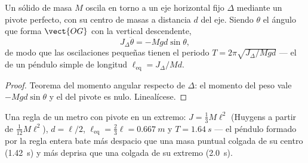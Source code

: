 \begin{proposition}\label{prop:b2:rigid-body-mechanics:pendulum}
Un sólido de masa $M$ oscila en torno a un eje horizontal fijo $\Delta$
mediante un pivote perfecto, con su centro de masas a distancia $d$ del
eje. Siendo $\theta$ el ángulo que forma $\vect{OG}$ con la vertical descendente,
\[
J_\Delta\ddot\theta = -Mgd\sin\theta ,
\]
de modo que las oscilaciones pequeñas tienen el periodo $T = 2\pi\sqrt{J_\Delta/Mgd}$
--- el de un péndulo simple de longitud $\ell_{\text{eq}} = J_\Delta/Md$.
\end{proposition}

\begin{proof}
Teorema del momento angular respecto de $\Delta$: el momento del peso vale
$-Mgd\sin\theta$ y el del pivote es nulo. Linealícese.
\end{proof}

\begin{example}\label{ex:b2:rigid-body-mechanics:rule}
Una regla de un metro con pivote en un extremo: $J = \tfrac13M\ell^2$ (Huygens
a partir de $\tfrac1{12}M\ell^2$), $d = \ell/2$, $\ell_{\text{eq}} = \tfrac23\ell =
\qty{0.667}{m}$ y $T = \qty{1.64}{s}$ --- el péndulo formado por la regla
entera bate más despacio que una masa puntual colgada de su centro
(\qty{1.42}{s}) y más deprisa que una colgada de su extremo (\qty{2.0}{s}).
\end{example}

